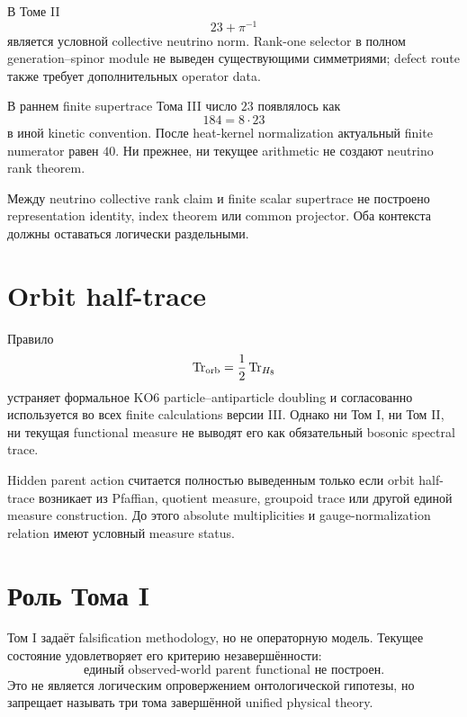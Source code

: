 В Томе II
\begin{equation}
 23+\pi^{-1}
\end{equation}
является условной collective neutrino norm. Rank-one selector в полном
generation--spinor module не выведен существующими симметриями; defect
route также требует дополнительных operator data.

В раннем finite supertrace Тома III число \(23\) появлялось как
\begin{equation}
 184=8\cdot23
\end{equation}
в иной kinetic convention. После heat-kernel normalization актуальный
finite numerator равен \(40\). Ни прежнее, ни текущее arithmetic не
создают neutrino rank theorem.

\begin{proposition}
Между neutrino collective rank claim и finite scalar supertrace не
построено representation identity, index theorem или common projector.
Оба контекста должны оставаться логически раздельными.
\end{proposition}

\section{Orbit half-trace}

Правило
\begin{equation}
 \operatorname{Tr}_{\mathrm{orb}}=\frac12\operatorname{Tr}_{H_8}
\end{equation}
устраняет формальное KO6 particle--antiparticle doubling и согласованно
используется во всех finite calculations версии III. Однако ни Том I, ни
Том II, ни текущая functional measure не выводят его как обязательный
bosonic spectral trace.

\begin{nogocriterion}
Hidden parent action считается полностью выведенным только если
orbit half-trace возникает из Pfaffian, quotient measure, groupoid trace
или другой единой measure construction. До этого absolute multiplicities
и gauge-normalization relation имеют условный measure status.
\end{nogocriterion}

\section{Роль Тома I}

Том I задаёт falsification methodology, но не операторную модель.
Текущее состояние удовлетворяет его критерию незавершённости:
\begin{equation}
 \text{единый observed-world parent functional не построен}.
\end{equation}
Это не является логическим опровержением онтологической гипотезы, но
запрещает называть три тома завершённой unified physical theory.

